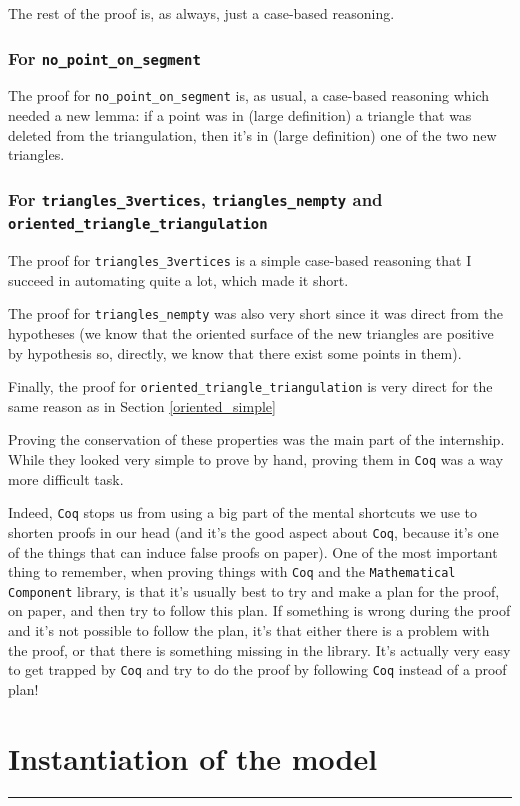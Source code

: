 \documentclass[a4paper,10pt]{article}
\begin{document}
The rest of the proof is, as always, just a case-based reasoning.

\subsubsection{For {\tt no\_point\_on\_segment}}
The proof for {\tt no\_point\_on\_segment} is, as usual, a case-based reasoning which needed a new lemma: if a point was in (large definition) a triangle that was deleted from the triangulation, then it's in (large definition) one of the two new triangles.

\subsubsection{For {\tt triangles\_3vertices}, {\tt triangles\_nempty} and {\tt oriented\_triangle\_triangulation}}
The proof for {\tt triangles\_3vertices} is a simple case-based reasoning that I succeed in automating quite a lot, which made it short.

The proof for {\tt triangles\_nempty} was also very short since it was direct from the hypotheses (we know that the oriented surface of the new triangles are positive by hypothesis so, directly, we know that there exist some points in them).

Finally, the proof for {\tt oriented\_triangle\_triangulation} is very direct for the same reason as in Section \ref{oriented_simple}

Proving the conservation of these properties was the main part of the internship. While they looked very simple to prove by hand, proving them in {\tt Coq} was a way more difficult task.

Indeed, {\tt Coq} stops us from using a big part of the mental shortcuts we use to shorten proofs in our head (and it's the good aspect about {\tt Coq}, because it's one of the things that can induce false proofs on paper). One of the most important thing to remember, when proving things with {\tt Coq} and the {\tt Mathematical Component} library, is that it's usually best to try and make a plan for the proof, on paper, and then try to follow this plan.  If something is wrong during the proof and it's not possible to follow the plan, it's that either there is a problem with the proof, or that there is something missing in the library. It's actually very easy to get trapped by {\tt Coq} and try to do the proof by following {\tt Coq} instead of a proof plan!

\section{Instantiation of the model}
\rule{\linewidth}{0.5pt}
\end{document}
